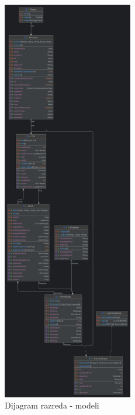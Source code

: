 			\begin{figure}[H]
				\includegraphics[height=500pt]{slike/ClassDiagram1.PNG}
				\caption{Dijagram razreda - modeli}
				\label{fig:classDiagram1}
			\end{figure}
			
